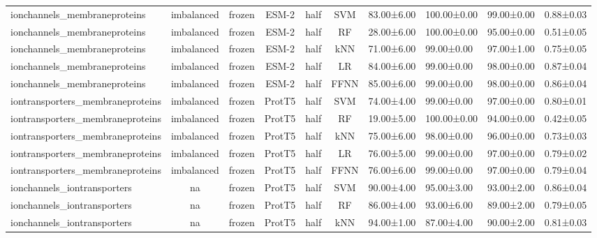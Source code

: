 \begin{tabular}{lcccccc}
    ionchannels\_membraneproteins & imbalanced &         frozen &        ESM-2 &      half &        SVM &  83.00±6.00 & 100.00±0.00 &  99.00±0.00 & 0.88±0.03 \\
    ionchannels\_membraneproteins & imbalanced &         frozen &        ESM-2 &      half &         RF &  28.00±6.00 & 100.00±0.00 &  95.00±0.00 & 0.51±0.05 \\
    ionchannels\_membraneproteins & imbalanced &         frozen &        ESM-2 &      half &        kNN &  71.00±6.00 &  99.00±0.00 &  97.00±1.00 & 0.75±0.05 \\
    ionchannels\_membraneproteins & imbalanced &         frozen &        ESM-2 &      half &         LR &  84.00±6.00 &  99.00±0.00 &  98.00±0.00 & 0.87±0.04 \\
    ionchannels\_membraneproteins & imbalanced &         frozen &        ESM-2 &      half &       FFNN &  85.00±6.00 &  99.00±0.00 &  98.00±0.00 & 0.86±0.04 \\
iontransporters\_membraneproteins & imbalanced &         frozen &       ProtT5 &      half &        SVM &  74.00±4.00 &  99.00±0.00 &  97.00±0.00 & 0.80±0.01 \\
iontransporters\_membraneproteins & imbalanced &         frozen &       ProtT5 &      half &         RF &  19.00±5.00 & 100.00±0.00 &  94.00±0.00 & 0.42±0.05 \\
iontransporters\_membraneproteins & imbalanced &         frozen &       ProtT5 &      half &        kNN &  75.00±6.00 &  98.00±0.00 &  96.00±0.00 & 0.73±0.03 \\
iontransporters\_membraneproteins & imbalanced &         frozen &       ProtT5 &      half &         LR &  76.00±5.00 &  99.00±0.00 &  97.00±0.00 & 0.79±0.02 \\
iontransporters\_membraneproteins & imbalanced &         frozen &       ProtT5 &      half &       FFNN &  76.00±6.00 &  99.00±0.00 &  97.00±0.00 & 0.79±0.04 \\
     ionchannels\_iontransporters &         na &         frozen &       ProtT5 &      half &        SVM &  90.00±4.00 &  95.00±3.00 &  93.00±2.00 & 0.86±0.04 \\
     ionchannels\_iontransporters &         na &         frozen &       ProtT5 &      half &         RF &  86.00±4.00 &  93.00±6.00 &  89.00±2.00 & 0.79±0.05 \\
     ionchannels\_iontransporters &         na &         frozen &       ProtT5 &      half &        kNN &  94.00±1.00 &  87.00±4.00 &  90.00±2.00 & 0.81±0.03 \\

\end{tabular}
